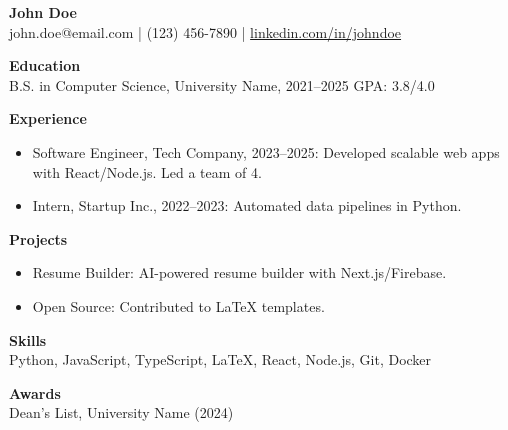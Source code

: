 \documentclass[10pt]{article}
\begin{document}
\begin{center}
    {\large \textbf{John Doe}} \\
    john.doe@email.com \quad | \quad (123) 456-7890 \quad | \quad \href{https://linkedin.com/in/johndoe}{linkedin.com/in/johndoe}
\end{center}

\vspace{2mm}

\textbf{Education} \\
B.S. in Computer Science, University Name, 2021--2025 \hfill GPA: 3.8/4.0

\vspace{1mm}

\textbf{Experience}
\begin{itemize}[leftmargin=*]
  \item Software Engineer, Tech Company, 2023--2025: Developed scalable web apps with React/Node.js. Led a team of 4.
  \item Intern, Startup Inc., 2022--2023: Automated data pipelines in Python.
\end{itemize}

\textbf{Projects}
\begin{itemize}[leftmargin=*]
  \item Resume Builder: AI-powered resume builder with Next.js/Firebase.
  \item Open Source: Contributed to LaTeX templates.
\end{itemize}

\textbf{Skills} \\
Python, JavaScript, TypeScript, LaTeX, React, Node.js, Git, Docker

\textbf{Awards} \\
Dean's List, University Name (2024)
\end{document}
